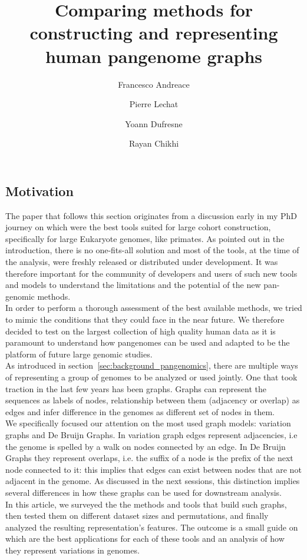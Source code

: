 \subsection{Motivation}
The paper that follows this section originates from a discussion early in my PhD journey on which were the best tools suited for large cohort \pangenome construction, specifically for large 
Eukaryote genomes, like primates. As pointed out in the introduction, there is no one-fits-all solution and most of the tools, at the time of the analysis, were freshly released or distributed under development. It was therefore important for the community of developers and users of such new tools and models to understand the limitations and the potential of the new pan-genomic methods.\\
In order to perform a thorough assessment of the best available methods, we tried to mimic the conditions that they could face in the near future. We therefore decided to test on the largest collection of high quality human data as it is paramount to understand how pangenomes can be used and adapted to be the platform of future large genomic studies.\\
As introduced in section~\ref{sec:background_pangenomics}, there are multiple ways of representing a group of genomes to be analyzed or used jointly. One that took traction in the last few years has been graphs. Graphs can represent the sequences as labels of nodes, relationship between them (adjacency or overlap) as edges and infer difference in the genomes as different set of nodes in them.\\
We specifically focused our attention on the most used graph models: variation graphs and De Bruijn Graphs. In variation graph edges represent adjacencies, i.e the genome is spelled by a walk on nodes connected by an edge. In De Bruijn Graphs they represent overlaps, i.e. the suffix of a node is the prefix of the next node connected to it: this implies that edges can exist between nodes that are not adjacent in the genome. As discussed in the next sessions, this distinction implies several differences in how these graphs can be used for downstream analysis. \\ 
In this article, we surveyed the the methods and tools that build such graphs, then tested them on different dataset sizes and permutations, and finally analyzed the resulting representation's features. The outcome is a small guide on which are the best applications for each of these tools and an analysis of how they represent variations in genomes. \\
\newpage
\author
{
	Francesco Andreace
	\and
	Pierre Lechat
	\and
	Yoann Dufresne
	\and
	Rayan Chikhi
}
\title{Comparing methods for constructing and representing human pangenome graphs}

